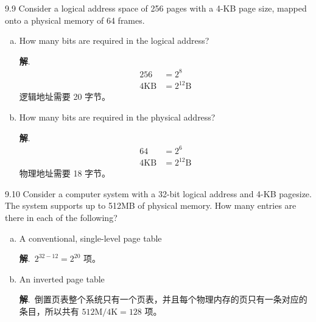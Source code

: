 \documentclass[12pt,a4paper]{article}
\newenvironment{problems}{\begin{list}{}{\renewcommand{\makelabel}[1]{\textbf{##1}\hfil}}}{\end{list}}
\providecommand{\sol}{\textbf{解}.~}
\begin{document}
\begin{problems}
    \item[9.9] Consider a logical address space of 256 pages with a 4-KB page size, mapped onto a physical memory of 64 frames.
    \begin{enumerate}[a.]
        \item How many bits are required in the logical address?
        
        \sol \begin{align*}
            256 &= 2^8\\
            4\text{KB} &= 2^{12} \text{B}
        \end{align*}
        逻辑地址需要 20 字节。

        \item How many bits are required in the physical address?
        
        \sol \begin{align*}
            64 &= 2^6\\
            4\text{KB} &= 2^{12} \text{B}
        \end{align*}
        物理地址需要 18 字节。
    \end{enumerate} 
    \item[9.10]  Consider a computer system with a 32-bit logical address and 4-KB pagesize. The system supports up to 512MB of physical memory. How many entries are there in each of the following?
    \begin{enumerate}[a.]
        \item A conventional, single-level page table
        
        \sol $2^{32-12}=2^{20}$ 项。
        \item An inverted page table
        
        \sol 倒置页表整个系统只有一个页表，并且每个物理内存的页只有一条对应的条目，所以共有 $512 \text{M}/4\text{K}=128$ 项。
    \end{enumerate} 
\end{problems}
\end{document}
